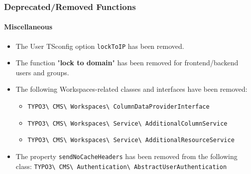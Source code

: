%

\begin{frame}[fragile]
	\frametitle{Deprecated/Removed Functions}
	\framesubtitle{Miscellaneous}

	\begin{itemize}
		\item The User TSconfig option \texttt{lockToIP} has been removed.
		\item The function "\textbf{lock to domain}" has been removed for frontend/backend
			users and groups.
		\item The following Workspaces-related classes and interfaces have been removed:
			\begin{itemize}\smaller
				\item \texttt{TYPO3\textbackslash
					CMS\textbackslash
					Workspaces\textbackslash
					ColumnDataProviderInterface}
				\item \texttt{TYPO3\textbackslash
					CMS\textbackslash
					Workspaces\textbackslash
					Service\textbackslash
					AdditionalColumnService}
				\item \texttt{TYPO3\textbackslash
					CMS\textbackslash
					Workspaces\textbackslash
					Service\textbackslash
					AdditionalResourceService}
			\end{itemize}\normalsize

		\item The property \texttt{sendNoCacheHeaders} has been removed from the following class:\newline
			\smaller\texttt{TYPO3\textbackslash
				CMS\textbackslash
				Authentication\textbackslash
				AbstractUserAuthentication}\normalsize
	\end{itemize}

\end{frame}

